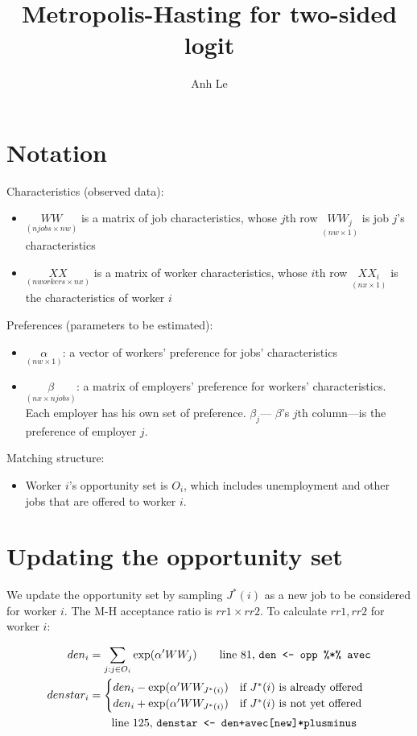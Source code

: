 \documentclass[12pt]{article}
\title{Metropolis-Hasting for two-sided logit}
\author{Anh Le}
\begin{document}
\maketitle

\section{Notation}

Characteristics (observed data):
\begin{itemize}[noitemsep]
\item $\underset{(njobs \times nw)}{WW}$ is a matrix of job characteristics, whose $j$th row $\underset{(nw \times 1)}{WW_j}$ is job $j$'s characteristics
\item $\underset{(nworkers \times nx)}{XX}$ is a matrix of worker characteristics, whose $i$th row $\underset{(nx \times 1)}{XX_i}$ is the characteristics of worker $i$
\end{itemize}

Preferences (parameters to be estimated):
\begin{itemize}[noitemsep]
\item $\underset{(nw \times 1)}{\alpha}$: a vector of workers' preference for jobs' characteristics
\item $\underset{(nx \times njobs)}{\beta}$: a matrix of employers' preference for workers' characteristics. Each employer has his own set of preference. $\beta_j$--- $\beta$'s $j$th column---is the preference of employer $j$.
\end{itemize}

Matching structure:
\begin{itemize}
\item Worker $i$'s opportunity set is $O_i$, which includes unemployment and other jobs that are offered to worker $i$.
\end{itemize}

\section{Updating the opportunity set}

We update the opportunity set by sampling $J^*(i)$ as a new job to be considered for worker $i$. The M-H acceptance ratio is $rr1 \times rr2$. To calculate $rr1, rr2$ for worker $i$:

\begin{align}
den_i &= \sum_{j: j \in O_i} \exp(
\alpha' WW_j) \qquad \text{line 81, \texttt{den <- opp \%*\% avec}} \\
denstar_i &= \begin{cases}
den_i - \exp(\alpha' WW_{J^*(i)}) &\text{if } J^*(i) \text{ is already offered}\\
den_i + \exp(\alpha' WW_{J^*(i)}) &\text{if } J^*(i) \text{ is not yet offered}
\end{cases} \\
& \qquad \text{line 125, \texttt{denstar <- den+avec[new]*plusminus}}
\end{align}
\end{document}
